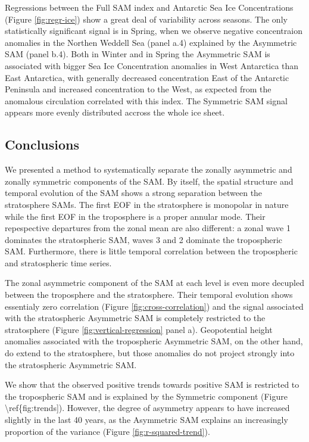 \documentclass[]{ametsocV5}
\begin{document}
Regressions between the Full SAM index and Antarctic Sea Ice
Concentrations (Figure \ref{fig:regr-ice}) show a great deal of
variability across seasons. The only statistically significant signal is
in Spring, when we observe negative concentraion anomalies in the
Northen Weddell Sea (panel a.4) explained by the Asymmetric SAM (panel
b.4). Both in Winter and in Spring the Asymmetric SAM is associated with
bigger Sea Ice Concentration anomalies in West Antarctica than East
Antarctica, with generally decreased concentration East of the Antarctic
Peninsula and increased concentration to the West, as expected from the
anomalous circulation correlated with this index. The Symmetric SAM
signal appears more evenly distributed accross the whole ice sheet.

\subsection{Conclusions}

We presented a method to systematically separate the zonally asymmetric
and zonally symmetric components of the SAM. By itself, the spatial
structure and temporal evolution of the SAM shows a strong separation
between the stratosphere SAMs. The first EOF in the stratosphere is
monopolar in nature while the first EOF in the troposphere is a proper
annular mode. Their repespective departures from the zonal mean are also
different: a zonal wave 1 dominates the stratospheric SAM, waves 3 and 2
dominate the tropospheric SAM. Furthermore, there is little temporal
correlation between the tropospheric and stratospheric time series.

The zonal asymmetric component of the SAM at each level is even more
decupled between the troposphere and the stratosphere. Their temporal
evolution shows essentialy zero correlation (Figure
\ref{fig:cross-correlation}) and the signal associated with the
stratospheric Asymmetric SAM is completely restricted to the
stratosphere (Figure \ref{fig:vertical-regression} panel a).
Geopotential height anomalies associated with the tropospheric
Asymmetric SAM, on the other hand, do extend to the stratosphere, but
those anomalies do not project strongly into the stratospheric
Asymmetric SAM.

We show that the observed positive trends towards positive SAM is
restricted to the tropospheric SAM and is explained by the Symmetric
component (Figure \textbackslash{}ref\{fig:trends{]}). However, the
degree of asymmetry appears to have increased slightly in the last 40
years, as the Asymmetric SAM explains an increasingly proportion of the
variance (Figure \ref{fig:r-squared-trend}).
\end{document}
